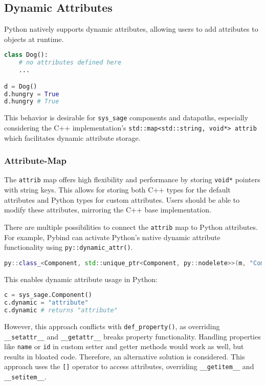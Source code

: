 \subsection{Dynamic Attributes}

Python natively supports dynamic attributes, allowing users to add attributes to objects at runtime.

\begin{lstlisting}[language=Python, xleftmargin=4em, frame = single]
class Dog():
    # no attributes defined here
    ...

d = Dog()
d.hungry = True
d.hungry # True
\end{lstlisting}

This behavior is desirable for \verb|sys_sage| components and datapaths, especially considering the C++ implementation's \verb|std::map<std::string, void*> attrib| which facilitates dynamic attribute storage.

\subsubsection{Attribute-Map}

The \verb|attrib| map offers high flexibility and performance by storing \verb|void*| pointers with string keys. This allows for storing both C++ types for the default attributes and Python types for custom attributes. Users should be able to modify these attributes, mirroring the C++ base implementation.

There are multiple possibilities to connect the \verb|attrib| map to Python attributes. For example, Pybind can activate Python's native dynamic attribute functionality using \verb|py::dynamic_attr()|.

\begin{lstlisting}[language=C++, xleftmargin=4em, frame = single]
py::class_<Component, std::unique_ptr<Component, py::nodelete>>(m, "Component", py::dynamic_attr(),"Generic Component");
\end{lstlisting}

This enables dynamic attribute usage in Python:

\begin{lstlisting}[language=Python, xleftmargin=4em, frame = single]
c = sys_sage.Component()
c.dynamic = "attribute"
c.dynamic # returns "attribute"
\end{lstlisting}

However, this approach conflicts with \verb|def_property()|, as overriding \verb|__setattr__| and \verb|__getattr__| breaks property functionality. Handling properties like \verb|name| or \verb|id| in custom setter and getter methods would work as well, but results in bloated code. Therefore, an alternative solution is considered. This approach uses the \verb|[]| operator to access attributes, overriding \verb|__getitem__| and \verb|__setitem__|.

